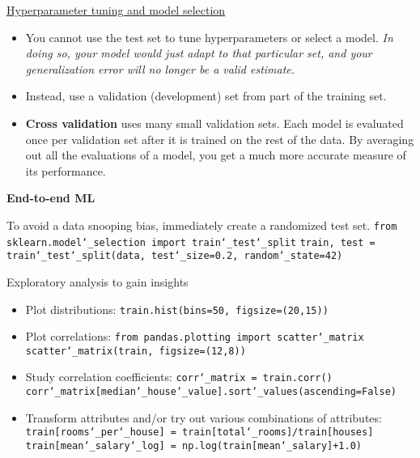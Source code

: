 \underline{Hyperparameter tuning and model selection}
\begin{itemize}
\vspace{-3.0mm}
\item
You cannot use the test set to tune hyperparameters or select a model.\newline
\textit{In doing so, your model would just adapt to that particular set,
and your generalization error will no longer be a valid estimate.}
\item
Instead, use a validation (development) set from part of the training set.
\item
\textbf{Cross validation} uses many small validation sets.
Each model is evaluated once per validation set after it is trained on the rest of the data.
By averaging out all the evaluations of a model,
you get a much more accurate measure of its performance.
\end{itemize}



\newpage
\textbf{End-to-end ML}

To avoid a data snooping bias, immediately create a randomized test set.\newline
\texttt{from sklearn.model\char`_selection import train\char`_test\char`_split}\newline
\texttt{train, test = train\char`_test\char`_split(data, test\char`_size=0.2, random\char`_state=42)}\newline

Exploratory analysis to gain insights
\begin{itemize}
\vspace{-3.0mm}
\item
Plot distributions:\newline
\texttt{train.hist(bins=50, figsize=(20,15))} 
\item
Plot correlations:\newline
\texttt{from pandas.plotting import scatter\char`_matrix}\newline
\texttt{scatter\char`_matrix(train, figsize=(12,8))}
\item
Study correlation coefficients:\newline
\texttt{corr\char`_matrix = train.corr()}\newline
\texttt{corr\char`_matrix[\textquotesingle median\char`_house\char`_value\textquotesingle].sort\char`_values(ascending=False)}
\item
Transform attributes and/or try out various combinations of attributes:\newline
\texttt{train[\textquotesingle rooms\char`_per\char`_house\textquotesingle] = train[\textquotesingle total\char`_rooms\textquotesingle]/train[\textquotesingle houses\textquotesingle]}\newline
\texttt{train[\textquotesingle mean\char`_salary\char`_log\textquotesingle] = np.log(train[\textquotesingle mean\char`_salary\textquotesingle]+1.0)}
\end{itemize}

